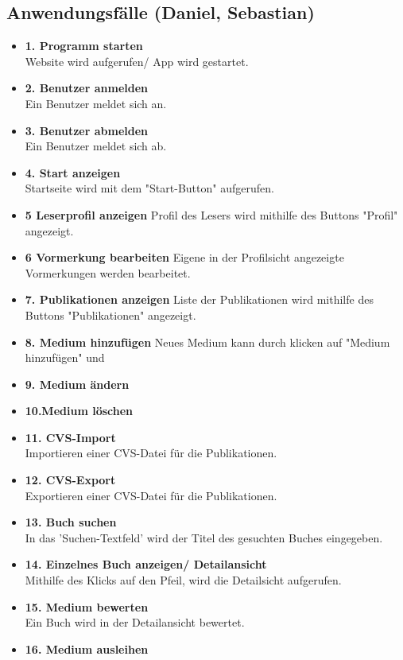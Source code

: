 \documentclass[fontsize=12pt,paper=a4,twoside]{scrartcl}
\begin{document}
\subsection{Anwendungsfälle (Daniel, Sebastian)} \label{subsec:Anwendungsf.} 
\begin{itemize}
	\item \textbf{1. Programm starten}\\
	Website wird aufgerufen/ App wird gestartet. 
	\item \textbf{2. Benutzer anmelden}\\
	Ein Benutzer meldet sich an. 
	\item \textbf{3. Benutzer abmelden}\\
	Ein Benutzer meldet sich ab. 
	\item \textbf{4. Start anzeigen}\\
	Startseite wird mit dem "Start-Button" aufgerufen. 
	\item \textbf{5 Leserprofil anzeigen} Profil des Lesers wird mithilfe des Buttons "Profil" angezeigt. 
	\item \textbf{6 Vormerkung bearbeiten} Eigene in der Profilsicht angezeigte Vormerkungen werden bearbeitet. 
	\item \textbf{7. Publikationen anzeigen} Liste der Publikationen wird mithilfe des Buttons "Publikationen" angezeigt. 
	\item \textbf{8. Medium hinzufügen} Neues Medium kann durch klicken auf "Medium hinzufügen" und 
	\item \textbf{9. Medium ändern} 
	\item \textbf{10.Medium löschen} 
	\item \textbf{11. CVS-Import}\\
	Importieren einer CVS-Datei für die Publikationen. 
	\item \textbf{12. CVS-Export}\\
	Exportieren einer CVS-Datei für die Publikationen. 
	\item \textbf{13. Buch suchen}\\
	In das 'Suchen-Textfeld' wird der Titel des gesuchten Buches eingegeben. 
	\item \textbf{14. Einzelnes Buch anzeigen/ Detailansicht}\\
	Mithilfe des Klicks auf den Pfeil, wird die Detailsicht aufgerufen. 
	\item \textbf{15. Medium bewerten}\\
	Ein Buch wird in der Detailansicht bewertet. 
	\item \textbf{16. Medium ausleihen}\\

\end{itemize}
\end{document}
